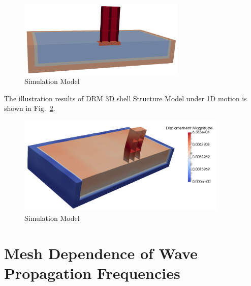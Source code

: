 \begin{figure}[H]
  \centering
  \includegraphics[width = 8cm]{./Figure-files/Day2/Deconvolution_3by1D_Motions/Shell_Structure_Soil_Interaction_3D_DRM/overview.png}
  \caption{Simulation Model}
  \label{fig_decon_3by1D_motion_3D_model_shell}
\end{figure}


The illustration results of DRM 3D shell Structure Model under 1D motion is shown 
in Fig.~\ref{fig_decon_3by1D_motion_3D_model_solid_shell_structure}. 

\begin{figure}[H]
  \centering
  \includegraphics[width = 10cm]{./Figure-files/Day2/Deconvolution_3by1D_Motions/Shell_Structure_Soil_Interaction_3D_DRM/DRM3D_motion3D_shell.png}
  \caption{Simulation Model}
  \label{fig_decon_3by1D_motion_3D_model_solid_shell_structure}
\end{figure}


















\clearpage
\newpage
\section{Mesh Dependence of Wave Propagation Frequencies}
\label{Convolution_Motions}


